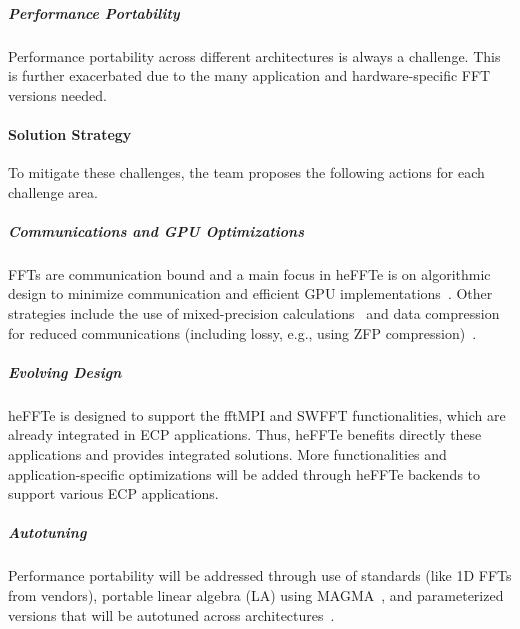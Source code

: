\subparagraph{Performance Portability}
Performance portability across different architectures is always a challenge.
This is further exacerbated due to the many application and 
hardware-specific FFT versions needed.

\paragraph{Solution Strategy}
To mitigate these challenges, the team proposes the following actions for each challenge area.


\subparagraph{Communications and GPU Optimizations}
FFTs are communication bound and a main focus in heFFTe is on algorithmic
design to minimize communication and efficient GPU 
implementations~\cite{sc19,eurompi19,heffte-pact21,hpec21}.
Other strategies include the use of mixed-precision calculations~\cite{Haidar2018,tcfft18}
and data compression for reduced communications (including lossy, e.g., using ZFP 
compression)~\cite{Anztetal2020}.

\subparagraph{Evolving Design}
heFFTe is designed to support the fftMPI and SWFFT functionalities,
which are already integrated in ECP applications. Thus, heFFTe benefits
directly these applications and provides integrated solutions. 
More functionalities and application-specific optimizations will be added 
through heFFTe backends to support various ECP applications. 

\subparagraph{Autotuning}
Performance portability will be addressed through use of standards (like 1D FFTs 
from vendors), portable linear algebra (LA) using MAGMA~\cite{Tomov_2010_pcsa}, 
and parameterized versions that will be autotuned across architectures~\cite{Nath2010,Kurzak2012gemmfermi}.



